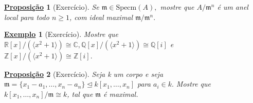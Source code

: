 \documentclass{article}
\newtheorem*{prop*}{\underline{Proposi\c c\~ao}}
\newtheorem{example}{\underline{Exemplo}}
\begin{document}
    \begin{prop*}[Exercício]
      Se \(\mathfrak{m}\in \mathrm{Specm}(A),\) mostre que \(A/\mathfrak{m}^{n}\) é um anel local para todo
      \(n \geq 1\), com ideal maximal \(\mathfrak{m}/\mathfrak{m}^{n}.\)
    \end{prop*}
    \begin{example}[Exercício]
      Mostre que \(\mathbb{R}[x]/(\langle x^{2}+1 \rangle)\cong{\mathbb{C}}, \mathbb{Q}[x]/(\langle x^{2}+1 \rangle)\cong{\mathbb{Q}[i]}\)
      e \(\mathbb{Z}[x]/(\langle x^{2}+1 \rangle)\cong{\mathbb{Z}[i]}.\)
    \end{example}
    \begin{prop*}[Exercício]
      Seja k um corpo e seja \(\mathfrak{m} = \{x_{1}-a_{1}, \dotsc, x_{n}-a_{n}\}\trianglelefteq{k[x_{1}, \dotsc, x_{n}]}\) para
      \(a_{i}\in k.\) Mostre que \(k[x_{1}, \dotsc, x_{n}]/\mathfrak{m}\cong{k}\), tal que \(\mathfrak{m}\) é maximal. 
    \end{prop*}
\end{document}
